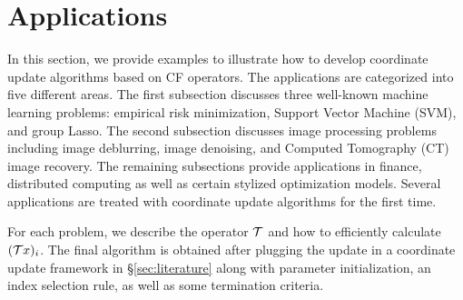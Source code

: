 \section{Applications}\label{sec:applications}
In this section, we provide examples to illustrate how to develop coordinate update algorithms based on CF operators. The applications are categorized into five different areas. The first subsection discusses three well-known machine learning problems: empirical risk minimization, Support Vector Machine (SVM), and group Lasso. The second subsection  discusses image processing problems including image deblurring, image denoising, and  Computed Tomography (CT) image recovery. The remaining subsections provide applications in finance, distributed computing as well as certain stylized optimization models. Several applications are treated with coordinate update algorithms for the first time. 
\DIFaddbegin 

For each problem, we describe the operator ${\mathcal{T}}$ and how to efficiently calculate $({\mathcal{T}} x)_i$. The final algorithm is obtained after plugging the update in a coordinate update framework in \S\ref{sec:literature} along with  parameter initialization, an index selection rule, as well as some termination criteria.
